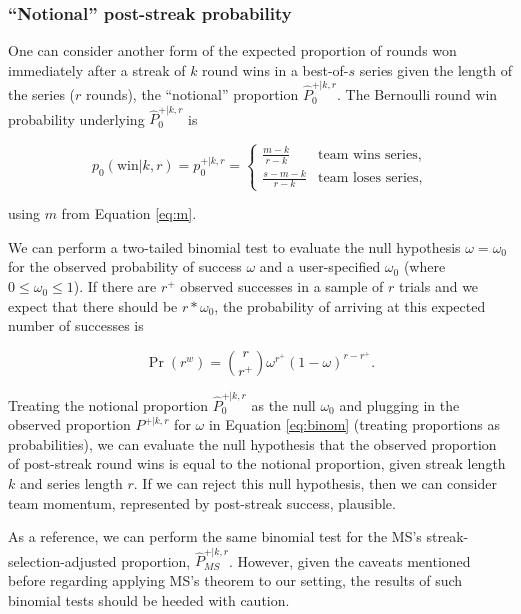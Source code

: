 \documentclass{article}
\begin{document}
\hypertarget{notional-post-streak-probability}{%
\subsubsection{``Notional'' post-streak
probability}\label{notional-post-streak-probability}}

One can consider another form of the expected proportion of rounds won
immediately after a streak of \(k\) round wins in a best-of-\(s\) series
given the length of the series (\(r\) rounds), the ``notional''
proportion \(\hat{P}^{+|k,r}_0\). The Bernoulli round win probability
underlying \(\hat{P}^{+|k,r}_0\) is

\begin{equation}\label{eq:pwkr}
p_0(\text{win} | k, r) = p^{+|k,r}_0 = \begin{cases}
  \frac{m - k}{r - k} & \text{team wins series}, \\
  \frac{s - m - k}{r - k} & \text{team loses series},
\end{cases}
\end{equation}

using \(m\) from Equation \ref{eq:m}.

We can perform a two-tailed binomial test to evaluate the null
hypothesis \(\omega = \omega_0\) for the observed probability of success
\(\omega\) and a user-specified \(\omega_0\) (where
\(0 \leq \omega_0 \leq 1\)). If there are \(r^+\) observed successes in
a sample of \(r\) trials and we expect that there should be
\(r * \omega_0\), the probability of arriving at this expected number of
successes is

\begin{equation}\label{eq:binom}
\Pr(r^w) = {\binom {r}{r^+}} \omega^{r^+}(1-\omega)^{r-r^+}.
\end{equation}

Treating the notional proportion \(\hat{P}^{+|k,r}_0\) as the null
\(\omega_0\) and plugging in the observed proportion \(P^{+|k,r}\) for
\(\omega\) in Equation \ref{eq:binom} (treating proportions as
probabilities), we can evaluate the null hypothesis that the observed
proportion of post-streak round wins is equal to the notional
proportion, given streak length \(k\) and series length \(r\). If we can
reject this null hypothesis, then we can consider team momentum,
represented by post-streak success, plausible.

As a reference, we can perform the same binomial test for the MS's
streak-selection-adjusted proportion, \(\hat{P}^{+|k,r}_{MS}\). However,
given the caveats mentioned before regarding applying MS's theorem to
our setting, the results of such binomial tests should be heeded with
caution.
\end{document}
